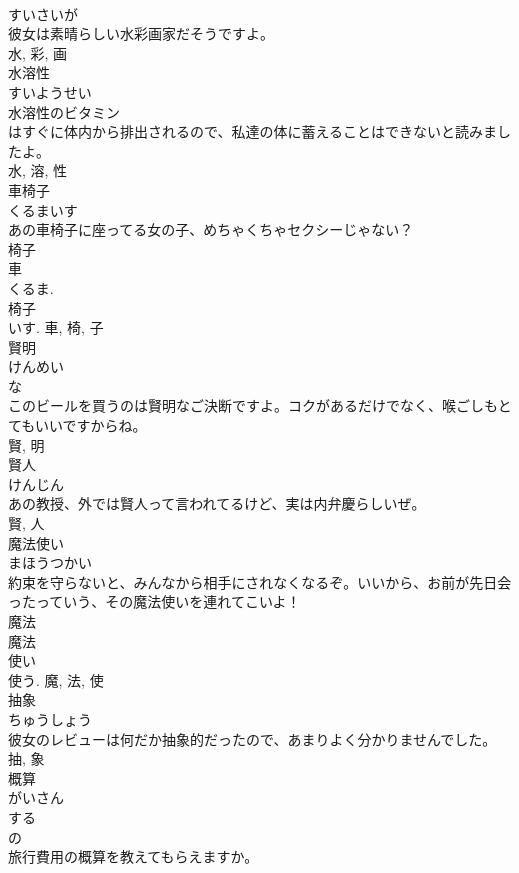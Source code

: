 \documentclass[8pt]{extreport}
\begin{document}
\begin{CJK}{UTF8}{min}
\\	すいさいが	
\\	彼女は素晴らしい水彩画家だそうですよ。	
\\	水, 彩, 画	
\\	水溶性	
\\	すいようせい	
\\	水溶性のビタミン
\\	はすぐに体内から排出されるので、私達の体に蓄えることはできないと読みましたよ。	
\\	水, 溶, 性	
\\	車椅子	
\\	くるまいす	
\\	あの車椅子に座ってる女の子、めちゃくちゃセクシーじゃない？	
\\	椅子 
\\	車 
\\	くるま. 
\\	椅子 
\\	いす.	車, 椅, 子	
\\	賢明	
\\	けんめい	
\\	な 
\\	このビールを買うのは賢明なご決断ですよ。コクがあるだけでなく、喉ごしもとてもいいですからね。	
\\	賢, 明	
\\	賢人	
\\	けんじん	
\\	あの教授、外では賢人って言われてるけど、実は内弁慶らしいぜ。	
\\	賢, 人	
\\	魔法使い	
\\	まほうつかい	
\\	約束を守らないと、みんなから相手にされなくなるぞ。いいから、お前が先日会ったっていう、その魔法使いを連れてこいよ！	
\\	魔法 
\\	魔法 
\\	使い 
\\	使う.	魔, 法, 使	
\\	抽象	
\\	ちゅうしょう	
\\	彼女のレビューは何だか抽象的だったので、あまりよく分かりませんでした。	
\\	抽, 象	
\\	概算	
\\	がいさん	
\\	する 
\\	の 
\\	旅行費用の概算を教えてもらえますか。	

\end{CJK}
\end{document}
